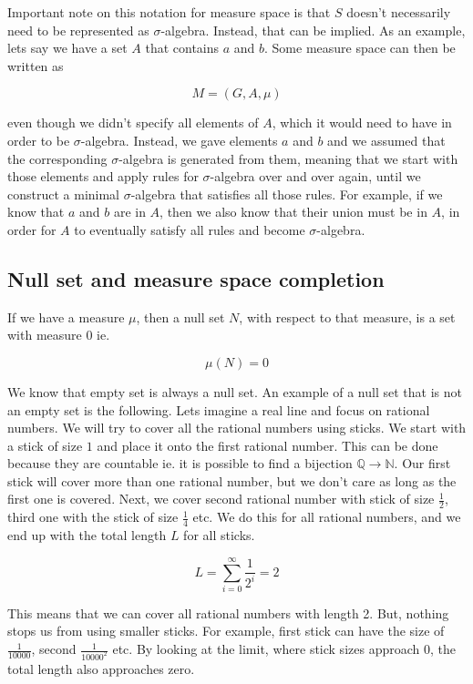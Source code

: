 \documentclass{article}
\begin{document}
Important note on this notation for measure space is that $S$ doesn't necessarily need to be represented as $\sigma$-algebra. Instead, that can be implied. As an example, lets say we have a set $A$ that contains $a$ and $b$. Some measure space can then be written as

\[ M=(G,A,\mu) \]

even though we didn't specify all elements of $A$, which it would need to have in order to be $\sigma$-algebra. Instead, we gave elements $a$ and $b$ and we assumed that the corresponding $\sigma$-algebra is generated from them, meaning that we start with those elements and apply rules for $\sigma$-algebra over and over again, until we construct a minimal $\sigma$-algebra that satisfies all those rules. For example, if we know that $a$ and $b$ are in $A$, then we also know that their union must be in $A$, in order for $A$ to eventually satisfy all rules and become $\sigma$-algebra.

\subsection{Null set and measure space completion}
If we have a measure $\mu$, then a null set $N$, with respect to that measure, is a set with measure 0 ie.

\[ \mu(N) = 0 \]

We know that empty set is always a null set. An example of a null set that is not an empty set is the following. Lets imagine a real line and focus on rational numbers. We will try to cover all the rational numbers using sticks. We start with a stick of size $1$ and place it onto the first rational number. This can be done because they are countable ie. it is possible to find a bijection $\mathbb{Q}\to\mathbb{N}$. Our first stick will cover more than one rational number, but we don't care as long as the first one is covered. Next, we cover second rational number with stick of size $\frac{1}{2}$, third one with the stick of size $\frac{1}{4}$ etc. We do this for all rational numbers, and we end up with the total length $L$ for all sticks.

\[ L=\sum_{i=0}^{\infty}\frac{1}{2^i}=2\]

This means that we can cover all rational numbers with length 2. But, nothing stops us from using smaller sticks. For example, first stick can have the size of $\frac{1}{10000}$, second $\frac{1}{10000^2}$ etc. By looking at the limit, where stick sizes approach 0, the total length also approaches zero.
\end{document}

